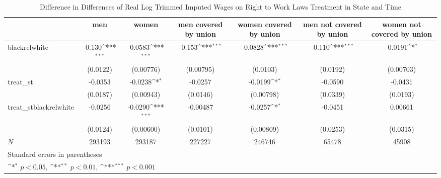 \begin{table}[htbp]\centering
\def\sym#1{\ifmmode^{#1}\else\(^{#1}\)\fi}
\caption{Difference in Differences of Real Log Trimmed Imputed Wages on Right to Work Laws Treatment in State and Time}
\begin{tabular}{l*{6}{c}}
\hline\hline
            &\multicolumn{1}{c}{men}&\multicolumn{1}{c}{women}&\multicolumn{1}{c}{men covered by union}&\multicolumn{1}{c}{women covered by union}&\multicolumn{1}{c}{men not covered by union}&\multicolumn{1}{c}{women not covered by union}\\
\hline
blackrelwhite&      -0.130\sym{***}&     -0.0583\sym{***}&      -0.153\sym{***}&     -0.0828\sym{***}&      -0.110\sym{***}&     -0.0191\sym{*}  \\
            &    (0.0122)         &   (0.00776)         &   (0.00795)         &    (0.0103)         &    (0.0192)         &   (0.00703)         \\
[1em]
treat\_st    &     -0.0353         &     -0.0238\sym{*}  &     -0.0257         &     -0.0199\sym{*}  &     -0.0590         &     -0.0431         \\
            &    (0.0187)         &   (0.00943)         &    (0.0146)         &   (0.00798)         &    (0.0339)         &    (0.0193)         \\
[1em]
treat\_stblackrelwhite&     -0.0256         &     -0.0290\sym{***}&    -0.00487         &     -0.0257\sym{*}  &     -0.0451         &     0.00661         \\
            &    (0.0124)         &   (0.00600)         &    (0.0101)         &   (0.00809)         &    (0.0253)         &    (0.0315)         \\
\hline
\(N\)       &      293193         &      293187         &      227227         &      246746         &       65478         &       45908         \\
\hline\hline
\multicolumn{7}{l}{\footnotesize Standard errors in parentheses}\\
\multicolumn{7}{l}{\footnotesize \sym{*} \(p<0.05\), \sym{**} \(p<0.01\), \sym{***} \(p<0.001\)}\\
\end{tabular}
\end{table}
